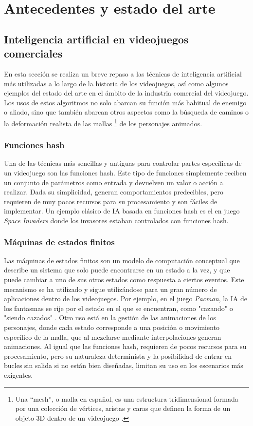 \chapter{Antecedentes y estado del arte} \label{chap:antecedentes}

\section{Inteligencia artificial en videojuegos comerciales} \label{sec:ia_videojuegos}

En esta sección se realiza un breve repaso a las técnicas de inteligencia artificial más utilizadas a lo largo de la historia de los videojuegos, así como algunos ejemplos del estado del arte en el ámbito de la industria comercial del videojuego. Los usos de estos algoritmos no solo abarcan su función más habitual de enemigo o aliado, sino que también abarcan otros aspectos como la búsqueda de caminos o la deformación realista de las mallas \footnote{Una ``mesh'', o malla en español, es una estructura tridimensional formada por una colección de vértices, aristas y caras que definen la forma de un objeto 3D dentro de un videojuego \cite{universidad_europea_que_2025}.} de los personajes animados.

\subsection{Funciones hash}

Una de las técnicas más sencillas y antiguas para controlar partes específicas de un videojuego son las funciones hash. Este tipo de funciones simplemente reciben un conjunto de parámetros como entrada y devuelven un valor o acción a realizar. Dada su simplicidad, generan comportamientos predecibles, pero requieren de muy pocos recursos para su procesamiento y son fáciles de implementar. Un ejemplo clásico de IA basada en funciones hash es el en juego \textit{Space Invaders} \cite{wikipedia_artificial_2025} donde los invasores estaban controlados con funciones hash. 

\subsection{Máquinas de estados finitos}

Las máquinas de estados finitos son un modelo de computación conceptual que describe un sistema que solo puede encontrarse en un estado a la vez, y que puede cambiar a uno de sus otros estados como respuesta a ciertos eventos. Este mecanismo se ha utilizado y sigue utilizándose para un gran número de aplicaciones dentro de los videojuegos. Por ejemplo, en el juego \textit{Pac\-man}, la IA de los fantasmas se rije por el estado en el que se encuentran, como "cazando" o "siendo cazados" \cite{mike_game_2016}. Otro uso está en la gestión de las animaciones de los personajes, donde cada estado corresponde a una posición o movimiento específico de la malla, que al mezclarse mediante interpolaciones generan animaciones. Al igual que las funciones hash, requieren de pocos recursos para su procesamiento, pero su naturaleza determinista y la posibilidad de entrar en bucles sin salida si no están bien diseñadas, limitan su uso en los escenarios más exigentes.

